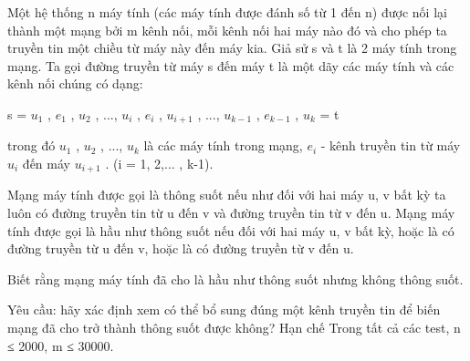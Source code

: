 Một hệ thống n máy tính (các máy tính được đánh số từ 1 đến n) được nối lại thành một mạng bởi m kênh nối, mỗi kênh nối hai máy nào đó và cho phép ta truyền tin một chiều từ máy này đến máy kia. Giả sử s và t là 2 máy tính trong mạng. Ta gọi đường truyền từ máy s đến máy t là một dãy các máy tính và các kênh nối chúng có dạng:  

   s = $u_{1}$   , $e_{1}$   , $u_{2}$   , ..., $u_{i}$   , $e_{i}$   , $u_{i+1}$   , ..., $u_{k-1}$   , $e_{k-1}$   , $u_{k}$   = t  

   trong đó $u_{1}$   , $u_{2}$   , ..., $u_{k}$   là các máy tính trong mạng, $e_{i}$   - kênh truyền tin từ máy $u_{i}$   đến máy $u_{i+1}$   . (i = 1, 2,... , k-1).  

   Mạng máy tính được gọi là thông suốt nếu như đối với hai máy u, v bất kỳ ta luôn có đường truyền tin từ u đến v và đường truyền tin từ v đến u. Mạng máy tính được gọi là hầu như thông suốt nếu đối với hai máy u, v bất kỳ, hoặc là có đường truyền từ u đến v, hoặc là có đường truyền từ v đến u.  

   Biết rằng mạng máy tính đã cho là hầu như thông suốt nhưng không thông suốt.  

   Yêu cầu: hãy xác định xem có thể bổ sung đúng một kênh truyền tin để biến mạng đã cho trở thành thông suốt được không?
   Hạn chế  
Trong tất cả các test, n ≤ 2000, m ≤ 30000.